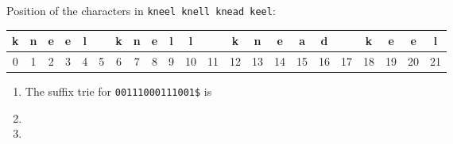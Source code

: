 \documentclass[12pt]{article}
\begin{document}
Position of the characters in \verb+kneel knell knead keel+:\\
\begin{tabular}{|c|c|c|c|c|c|c|c|c|c|c|c|c|c|c|c|c|c|c|c|c|c|}
\hline
k & n & e & e & l & & k & n & e & l & l & & k & n & e & a & d & & k & e & e & l\\\hline
0 & 1 & 2 & 3 & 4 & 5 & 6 & 7 & 8 & 9 & 10 & 11 & 12 & 13 & 14 & 15 & 16 & 17 & 18 & 19 & 20 & 21\\
\end{tabular}


\begin{enumerate}
\clearpage
\item The suffix trie for \texttt{00111000111001\$} is
\done
\item  \done
\item
\done
\end{enumerate}
\end{document}
